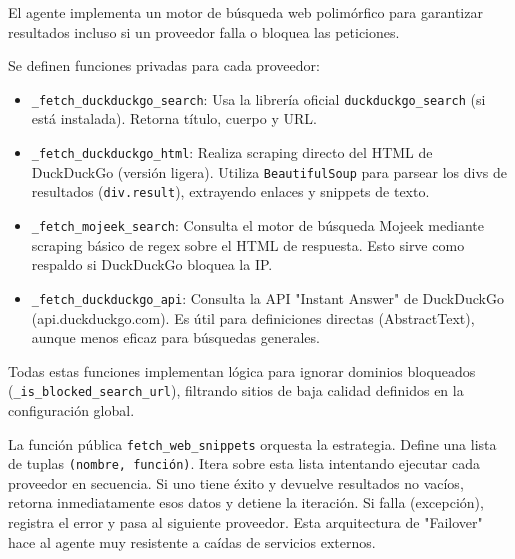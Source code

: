 \documentclass[letterpaper,12pt]{article}
\begin{document}
El agente implementa un motor de búsqueda web polimórfico para garantizar resultados incluso si un proveedor falla o bloquea las peticiones.

Se definen funciones privadas para cada proveedor:
\begin{itemize}
    \item \texttt{\_fetch\_duckduckgo\_search}: Usa la librería oficial \texttt{duckduckgo\_search} (si está instalada). Retorna título, cuerpo y URL.
    \item \texttt{\_fetch\_duckduckgo\_html}: Realiza scraping directo del HTML de DuckDuckGo (versión ligera). Utiliza \texttt{BeautifulSoup} para parsear los divs de resultados (\texttt{div.result}), extrayendo enlaces y snippets de texto.
    \item \texttt{\_fetch\_mojeek\_search}: Consulta el motor de búsqueda Mojeek mediante scraping básico de regex sobre el HTML de respuesta. Esto sirve como respaldo si DuckDuckGo bloquea la IP.
    \item \texttt{\_fetch\_duckduckgo\_api}: Consulta la API "Instant Answer" de DuckDuckGo (api.duckduckgo.com). Es útil para definiciones directas (AbstractText), aunque menos eficaz para búsquedas generales.
\end{itemize}

Todas estas funciones implementan lógica para ignorar dominios bloqueados (\texttt{\_is\_blocked\_search\_url}), filtrando sitios de baja calidad definidos en la configuración global.

La función pública \texttt{fetch\_web\_snippets} orquesta la estrategia. Define una lista de tuplas \texttt{(nombre, función)}. Itera sobre esta lista intentando ejecutar cada proveedor en secuencia. Si uno tiene éxito y devuelve resultados no vacíos, retorna inmediatamente esos datos y detiene la iteración. Si falla (excepción), registra el error y pasa al siguiente proveedor. Esta arquitectura de "Failover" hace al agente muy resistente a caídas de servicios externos.
\end{document}
